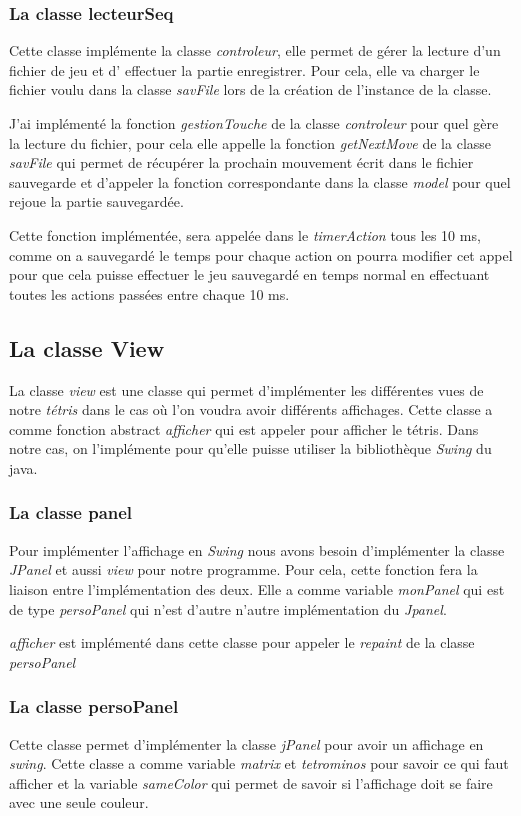 \documentclass{article}           %
\begin{document}
\subsubsection{La classe lecteurSeq}
Cette classe implémente la classe \emph{controleur}, elle permet de gérer la lecture d'un fichier de jeu et d' effectuer la partie enregistrer. Pour cela, elle va charger le fichier voulu dans la classe \emph{savFile} lors de la création de l'instance de la classe.

J'ai implémenté la fonction \emph{gestionTouche} de la classe \emph{controleur} pour quel gère la lecture du fichier, pour cela elle appelle la fonction \emph{getNextMove} de la classe \emph{savFile} qui permet de récupérer la prochain mouvement écrit dans le fichier sauvegarde et d'appeler la fonction correspondante dans la classe \emph{model} pour quel rejoue la partie sauvegardée.

Cette fonction implémentée, sera appelée dans le \emph{timerAction} tous les 10 ms, comme on a sauvegardé le temps pour chaque action on pourra modifier cet appel pour que cela puisse effectuer le jeu sauvegardé en temps normal en effectuant toutes les actions passées entre chaque 10 ms.


\subsection{La classe View}
La classe \emph{view} est une classe qui permet d'implémenter les différentes vues de notre \emph{tétris} dans le cas où l'on voudra avoir différents affichages. Cette classe a comme fonction abstract \emph{afficher} qui est appeler pour afficher le tétris. Dans notre cas, on l'implémente pour qu'elle puisse utiliser la bibliothèque \emph{Swing} du java.

\subsubsection{La classe panel}
Pour implémenter l'affichage en \emph{Swing} nous avons besoin d'implémenter la classe \emph{JPanel} et aussi \emph{view} pour notre programme. Pour cela, cette fonction fera la liaison entre l'implémentation des deux. Elle a comme variable \emph{monPanel} qui est de type \emph{persoPanel} qui n'est d'autre n'autre implémentation du \emph{Jpanel}.

\emph{afficher} est implémenté dans cette classe pour appeler le \emph{repaint} de la classe \emph{persoPanel}

\subsubsection{La classe persoPanel}
Cette classe permet d'implémenter la classe \emph{jPanel} pour avoir un affichage en \emph{swing}. Cette classe a comme variable \emph{matrix} et \emph{tetrominos} pour savoir ce qui faut afficher et la variable \emph{sameColor} qui permet de savoir si l'affichage doit se faire avec une seule couleur.
\end{document}
